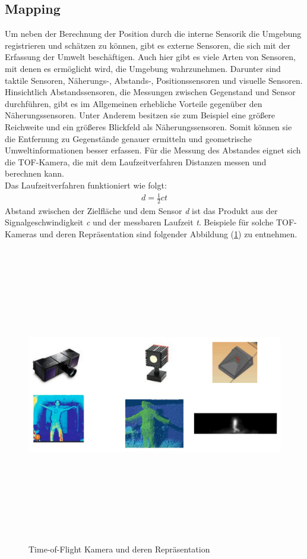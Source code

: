 \subsection{Mapping}
Um neben der Berechnung der Position durch die interne Sensorik die Umgebung registrieren und schätzen zu können, gibt es externe Sensoren, 
die sich mit der Erfassung der Umwelt beschäftigen. Auch hier gibt es viele Arten von Sensoren, mit denen es ermöglicht wird, die Umgebung 
wahrzunehmen. Darunter sind taktile Sensoren, Näherungs-, Abstands-, Positionssensoren und visuelle Sensoren. Hinsichtlich Abstandssensoren, die 
Messungen zwischen Gegenstand und Sensor durchführen, gibt es im Allgemeinen erhebliche Vorteile gegenüber den Näherungssensoren. Unter Anderem 
besitzen sie zum Beispiel eine größere Reichweite und ein größeres Blickfeld als Näherungssensoren. Somit können sie die Entfernung zu Gegenstände 
genauer ermitteln und geometrische Umweltinformationen besser erfassen. Für die Messung des Abstandes eignet sich die \ac{TOF}-Kamera, die 
mit dem Laufzeitverfahren Distanzen messen und berechnen kann. \cite{robotik2.2020m}
\\ 
Das Laufzeitverfahren funktioniert wie folgt:
\begin{align}
    \textit{d} = \frac{1}{2}\textit{ct}
\end{align}
Abstand zwischen der Zielfläche und dem Sensor \textit{d} ist das Produkt aus der Signalgeschwindigkeit \textit{c} und der messbaren Laufzeit 
\textit{t}. \cite{robotik2.2020m} Beispiele für solche \acs{TOF}-Kameras und deren Repräsentation sind folgender Abbildung (\ref{pic:tofCam}) zu entnehmen.
\begin{figure}[hbt!]
    \centering
    \includegraphics[width=13cm,height=13cm,keepaspectratio]{2Grundlagen/Bilder/tof_kamera.png}
    \caption{Time-of-Flight Kamera und deren Repräsentation \cite{robotik.2020m}}
    \label{pic:tofCam}
\end{figure}
